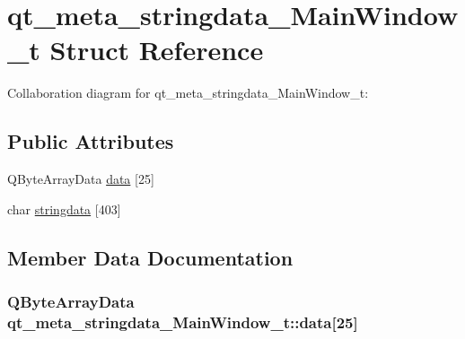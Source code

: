 \hypertarget{structqt__meta__stringdata__MainWindow__t}{}\section{qt\+\_\+meta\+\_\+stringdata\+\_\+\+Main\+Window\+\_\+t Struct Reference}
\label{structqt__meta__stringdata__MainWindow__t}


Collaboration diagram for qt\+\_\+meta\+\_\+stringdata\+\_\+\+Main\+Window\+\_\+t\+:
\subsection*{Public Attributes}
\begin{DoxyCompactItemize}
\item 
Q\+Byte\+Array\+Data \hyperlink{structqt__meta__stringdata__MainWindow__t_aa02fe4c1d8be32495df3dff0d3decbdb}{data} \mbox{[}25\mbox{]}
\item 
char \hyperlink{structqt__meta__stringdata__MainWindow__t_a6b033614233f7db3c4ec3324718af6ec}{stringdata} \mbox{[}403\mbox{]}
\end{DoxyCompactItemize}


\subsection{Member Data Documentation}
\hypertarget{structqt__meta__stringdata__MainWindow__t_aa02fe4c1d8be32495df3dff0d3decbdb}{}
\subsubsection[{data}]{\setlength{\rightskip}{0pt plus 5cm}Q\+Byte\+Array\+Data qt\+\_\+meta\+\_\+stringdata\+\_\+\+Main\+Window\+\_\+t\+::data\mbox{[}25\mbox{]}}\label{structqt__meta__stringdata__MainWindow__t_aa02fe4c1d8be32495df3dff0d3decbdb}
\hypertarget{structqt__meta__stringdata__MainWindow__t_a6b033614233f7db3c4ec3324718af6ec}{}
